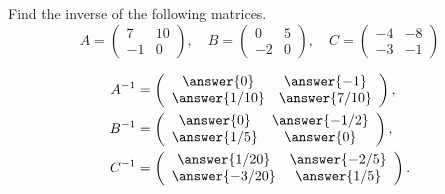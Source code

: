 \documentclass{ximera}
\author{Parisa Fatheddin}
\author{Parisa Fatheddin}
\begin{document}
\begin{exercise}
Find the inverse of the following matrices.
\[ A= \left(\begin{array}{cc}
  7 & 10   \\
  -1 &  0
\end{array}\right), \quad B= \left(\begin{array}{cc}
  0 & 5   \\
  -2 &  0
\end{array}\right), \quad C= \left(\begin{array}{cc}
  -4 & -8   \\
  -3 &  -1
\end{array}\right)
\]
\begin{prompt}
  \begin{align*}
    A^{-1}
    &= \left(
      \begin{array}{cc}
        \answer{0} & \answer{-1}   \\
        \answer{1/10} & \answer{7/10}   \\
      \end{array}
      \right), \\
    B^{-1}
    &= \left(
      \begin{array}{cc}
        \answer{0} & \answer{-1/2}   \\
        \answer{1/5} & \answer{0}   \\
      \end{array}
      \right), \\
    C^{-1}
    &= \left(
      \begin{array}{cc}
        \answer{1/20} & \answer{-2/5}   \\
        \answer{-3/20} & \answer{1/5}   \\
      \end{array}
      \right).
  \end{align*}
\end{prompt}
\end{exercise}
\end{document}
